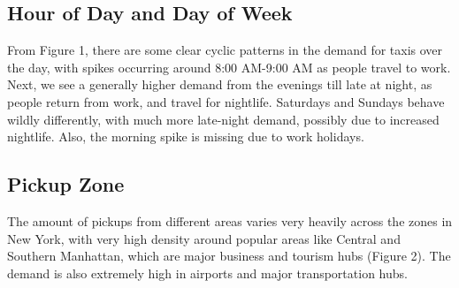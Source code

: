 \documentclass[11pt]{article}
\begin{document}
\subsection{Hour of Day and Day of Week}
From Figure 1, there are some clear cyclic patterns in the demand for taxis over the day, with spikes occurring around 8:00 AM-9:00 AM as people travel to work. Next, we see a generally higher demand from the evenings till late at night, as people return from work, and travel for nightlife. Saturdays and Sundays behave wildly differently, with much more late-night demand, possibly due to increased nightlife. Also, the morning spike is missing due to work holidays.
\begin{figure}[H]
\begin{floatrow}

\end{floatrow}
\end{figure}

\subsection{Pickup Zone}
The amount of pickups from different areas varies very heavily across the zones in New York, with very high density around popular areas like Central and Southern Manhattan, which are major business and tourism hubs (Figure 2). The demand is also extremely high in airports and major transportation hubs.
\end{document}

